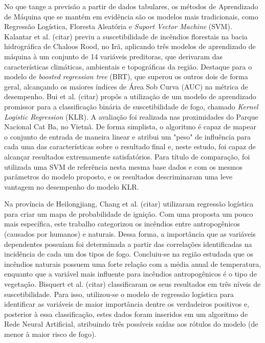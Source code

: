 No que tange a previsão a partir de dados tabulares, os métodos de Aprendizado de Máquina que se mantém em evidência são os modelos mais tradicionais, como Regressão Logística, Floresta Aleatória e \textit{Suport Vector Machine} (SVM). Kalantar et al. (citar) previu a suscetibilidade de incêndios florestais na bacia hidrográfica de Chaloos Rood, no Irã, aplicando três modelos de aprendizado de máquina à um conjunto de 14 variáveis preditoras, que derivaram das características climáticas, ambientais e topográficas da região. Destaque para o modelo de \textit{boosted regression tree} (BRT), que superou os outros dois de forma geral, alcançando os maiores índices de Área Sob Curva (AUC) na métrica de desempenho. Bui et al. (citar) propôs a utilização de um modelo de aprendizado promissor para a classificação binária de suscetibilidade de fogo, chamado \textit{Kernel Logistic Regression} (KLR). A avaliação foi realizada nas proximidades do Parque Nacional Cat Ba, no Vietnã. De forma simplista, o algoritmo é capaz de mapear o conjunto de entrada de maneira linear e atribui um "peso" de influência para cada uma das características sobre o resultado final e, neste estudo, foi capaz de alcançar resultados extremamente satisfatórios. Para título de comparação, foi utilizada uma SVM de referência nesta mesma base dados e com os mesmos parâmetros do modelo proposto, e os resultados descriminaram uma leve vantagem no desempenho do modelo KLR.

Na província de Heilongjiang, Chang et al. (citar) utilizaram regressão logística para criar um mapa de probabilidade de ignição. Com uma proposta um pouco mais específica, este trabalho categorizou os incêndios entre antropogênicos (causados por humanos) e naturais. Dessa forma, a importância que as variáveis dependentes possuíam foi determinada a partir das correlações identificadas na incidência de cada um dos tipos de fogo. Concluiu-se na região estudada que os incêndios naturais possuem uma forte relação com a média anual de temperatura, enquanto que a variável mais influente para incêndios antropogênicos é o tipo de vegetação. Bisquert et al. (citar) classificaram os seus resultados em três níveis de suscetibilidade. Para isso, utilizou-se o modelo de regressão logística para identificar as variáveis de maior importância dentre os verdadeiros positivos e, posterior à essa classificação, estes dados foram inseridos em um algoritmo de Rede Neural Artificial, atribuindo três possíveis saídas aos rótulos do modelo (de menor à maior risco de fogo).

